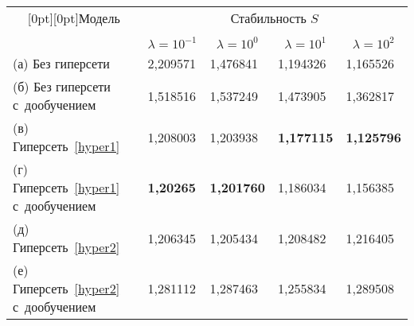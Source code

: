 \begin{multicols}{2}
\begin{table*}[b]
\begin{center}
\begin{tabular}{|l|l|l|l|l|}
\hline
\multicolumn{1}{|c|}{\raisebox{-6pt}[0pt][0pt]{Модель} } & \multicolumn{4}{c|}{Стабильность $S$} \\
\cline{2-5}
&&&&\\[-9pt]
& \multicolumn{1}{c|}{$\lambda = 10^{-1}$} & 
 \multicolumn{1}{c|}{$\lambda = 10^0$} & 
\multicolumn{1}{c|}{$\lambda = 10^1$} & 
\multicolumn{1}{c|}{$\lambda = 10^2$}\\ 
\hline
(а) Без гиперсети                          & 2,209571                                                            
& 1,476841                                                               & 
1,194326                                                                & 
1,165526                                                                  \\ 
(б) Без гиперсети с~дообучением            & 1,518516                                                                 
& 1,537249                                                        & 1,473905                                                          
& 1,362817                                                            \\ 
(в) Гиперсеть~\eqref{hyper1}               & 1,208003                                                                 
& 1,203938                                                               & 
\bf{1,177115}                                                              & 
\bf{1,125796}                                                                  
\\ 
(г) Гиперсеть~\eqref{hyper1} с~дообучением & \bf{1,20265}                                                                  
& \bf{1,201760}                                                            & 
1,186034                                                                & 
1,156385                                                                  \\ 
(д) Гиперсеть~\eqref{hyper2}               & 1,206345                                                                 
& 1,205434                                                               & 
1,208482                                                                & 
1,216405                                                                  \\ 
(е) Гиперсеть~\eqref{hyper2} с~дообучением & 1,281112                                                                 
& 1,287463                                                               & 
1,255834                                                                & 
1,289508                                                                  \\ 
\hline
\end{tabular}
\end{center}
\vspace*{-6pt}
\end{table*}


\end{multicols}
